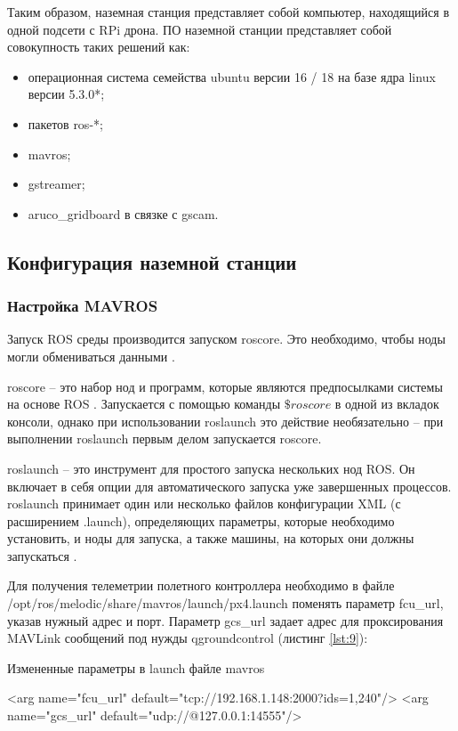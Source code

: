Таким образом, наземная станция представляет собой компьютер, находящийся в одной подсети с RPi дрона.
ПО наземной станции представляет собой совокупность таких решений как:
\begin{itemize}
	\item операционная система семейства ubuntu версии 16 / 18 на базе ядра linux версии 5.3.0*;
	\item пакетов ros-*;
	\item mavros;
	\item gstreamer;
	\item aruco\_gridboard в связке с gscam.
\end{itemize}

\subsection{Конфигурация наземной станции}

\subsubsection{Настройка MAVROS}

Запуск ROS среды производится запуском roscore. Это необходимо, чтобы ноды могли обмениваться данными \cite{pkg}.

roscore -- это набор нод и программ, которые являются предпосылками системы на основе ROS \cite{ros}. Запускается с помощью команды \(\$ roscore\) в одной из вкладок консоли, однако при использовании roslaunch это действие необязательно -- при выполнении roslaunch первым делом запускается roscore.

roslaunch -- это инструмент для простого запуска нескольких нод ROS. Он включает в себя опции для автоматического запуска уже завершенных процессов. roslaunch принимает один или несколько файлов конфигурации XML (с расширением .launch), определяющих параметры, которые необходимо установить, и ноды для запуска, а также машины, на которых они должны запускаться \cite{ros}.

Для получения телеметрии полетного контроллера необходимо в файле /opt/ros/melodic/share/mavros/launch/px4.launch поменять параметр fcu\_url, указав нужный адрес и порт. Параметр gcs\_url задает адрес для проксирования MAVLink сообщений под нужды qgroundcontrol (листинг \ref{lst:9}):
\begin{Program}[H]
	\caption{Измененные параметры в launch файле mavros} \label{lst:9}
	\begin{MyCode}
	<arg name="fcu_url" default="tcp://192.168.1.148:2000?ids=1,240"/>   
	<arg name="gcs_url" default="udp://@127.0.0.1:14555"/>
	\end{MyCode}
\end{Program}

